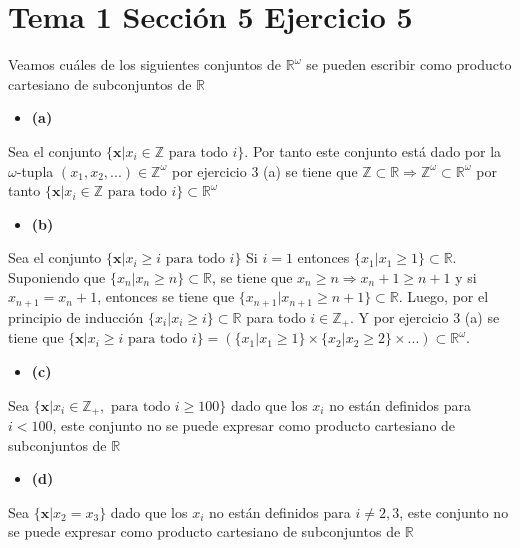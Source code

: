 \documentclass{article}
\newcommand{\vect}[1]{\boldsymbol{#1}}
\begin{document}
\section{Tema 1 Sección 5 Ejercicio 5}
Veamos cuáles de los siguientes conjuntos de $\mathbb{R}^{\omega}$ se pueden escribir como producto cartesiano de subconjuntos de $\mathbb{R}$
\begin{itemize}
\item \bf (a) \rm
\end{itemize}
Sea el conjunto $\{\vect{x}| x_i\in\mathbb{Z}\text{ para todo }i\}$. Por tanto este conjunto está dado por la $\omega$-tupla $(x_1,x_2,...)\in \mathbb{Z}^{\omega}$ por ejercicio 3 (a) se tiene que $\mathbb{Z}\subset \mathbb{R}\Rightarrow \mathbb{Z}^{\omega}\subset \mathbb{R}^{\omega}$ por tanto $\{\vect{x}| x_i\in\mathbb{Z}\text{ para todo }i\}\subset \mathbb{R}^{\omega}$
\begin{itemize}
\item \bf (b) \rm
\end{itemize}
Sea el conjunto $\{\vect{x}| x_i\geq i \text{ para todo }i\}$
Si $i=1$ entonces $\{x_1|x_1 \geq 1 \} \subset \mathbb{R}$. Suponiendo que $\{x_n|x_n \geq n \} \subset \mathbb{R}$, se tiene que $x_n\geq n\Rightarrow x_n+1\geq n+1$ y si $x_{n+1}=x_n+1$, entonces se tiene que $\{x_{n+1}|x_{n+1} \geq n+1 \} \subset \mathbb{R}$. Luego, por el principio de inducción $\{x_i|x_i \geq i \} \subset \mathbb{R}$
 para todo $i\in \mathbb{Z}_{+}$. Y por ejercicio 3 (a) se tiene que $\{\vect{x}|x_i \geq i \text{ para todo }i\}=(\{x_1|x_1 \geq 1\}\times \{x_2|x_2 \geq 2 \} \times ...)\subset \mathbb{R}^{\omega}$.
\begin{itemize}
\item \bf (c) \rm
\end{itemize}
Sea $\{\vect{x}|x_i\in\mathbb{Z}_{+}, \text{ para todo }i\geq 100\}$ dado que los $x_i$ no están definidos para $i<100$, este conjunto no se puede expresar como producto cartesiano de subconjuntos de $\mathbb{R}$
\begin{itemize}
\item \bf (d) \rm
\end{itemize}
Sea $\{\vect{x}|x_2=x_3\}$ dado que los $x_i$ no están definidos para $i\neq 2,3$, este conjunto no se puede expresar como producto cartesiano de subconjuntos de $\mathbb{R}$
%
%
\end{document}
